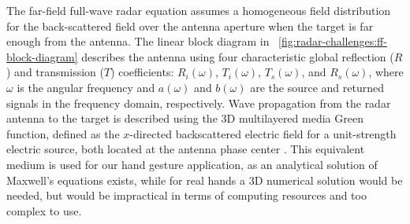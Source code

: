 The far-field full-wave radar equation \cite{Lambot:2004} assumes a homogeneous field distribution for the back-scattered field over the antenna aperture when the target is far enough from the antenna. The linear block diagram in \fig~\ref{fig:radar-challenges:ff-block-diagram} describes the antenna using four characteristic global reflection ($R$) and transmission ($T$) coefficients: $R_i(\omega)$, $T_i(\omega)$, $T_s(\omega)$, and $R_s(\omega)$, where $\omega$ is the angular frequency and $a(\omega)$ and $b(\omega)$ are the source and returned signals in the frequency domain, respectively. Wave propagation from the radar antenna to the target is described using the 3D multilayered media Green function, defined as the $x$-directed backscattered electric field for a unit-strength electric source, both located at the antenna phase center \cite{Chew:1990,Michalski:1990,Slob:2002,Lambot:2004}. This equivalent medium is used for our hand gesture application, as an analytical solution of Maxwell's equations exists, while for real hands a 3D numerical solution would be needed, but would be impractical in terms of computing resources and too complex to use.
